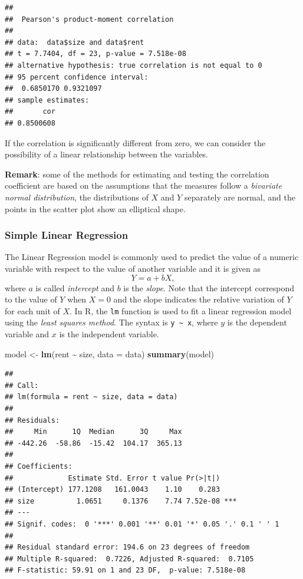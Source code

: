 \documentclass[
]{article}
\newenvironment{Shaded}{\begin{snugshade}}{\end{snugshade}}
\newcommand{\AttributeTok}[1]{\textcolor[rgb]{0.13,0.29,0.53}{#1}}
\newcommand{\FunctionTok}[1]{\textcolor[rgb]{0.13,0.29,0.53}{\textbf{#1}}}
\newcommand{\NormalTok}[1]{#1}
\newcommand{\OtherTok}[1]{\textcolor[rgb]{0.56,0.35,0.01}{#1}}
\newcommand{\SpecialCharTok}[1]{\textcolor[rgb]{0.81,0.36,0.00}{\textbf{#1}}}
\begin{document}
\begin{verbatim}
## 
##  Pearson's product-moment correlation
## 
## data:  data$size and data$rent
## t = 7.7404, df = 23, p-value = 7.518e-08
## alternative hypothesis: true correlation is not equal to 0
## 95 percent confidence interval:
##  0.6850170 0.9321097
## sample estimates:
##       cor 
## 0.8500608
\end{verbatim}

If the correlation is significantly different from zero, we can consider
the possibility of a linear relationship between the variables.

\textbf{Remark}: some of the methods for estimating and testing the
correlation coefficient are based on the assumptions that the measures
follow a \emph{bivariate normal distribution}, the distributions of
\(X\) and \(Y\) separately are normal, and the points in the scatter
plot show an elliptical shape.

\hypertarget{simple-linear-regression}{%
\subsubsection{Simple Linear
Regression}\label{simple-linear-regression}}

The Linear Regression model is commonly used to predict the value of a
numeric variable with respect to the value of another variable and it is
given as\\
\[ Y = a + b X,\] where \(a\) is called \emph{intercept} and \(b\) is
the \emph{slope}. Note that the intercept correspond to the value of
\(Y\) when \(X=0\) and the slope indicates the relative variation of
\(Y\) for each unit of \(X\). In R, the \texttt{lm} function is used to
fit a linear regression model using the \emph{least squares method}. The
syntax is \texttt{y\ \textasciitilde{}\ x}, where \(y\) is the dependent
variable and \(x\) is the independent variable.

\begin{Shaded}
\begin{Highlighting}[]
\NormalTok{model }\OtherTok{\textless{}{-}} \FunctionTok{lm}\NormalTok{(rent }\SpecialCharTok{\textasciitilde{}}\NormalTok{ size, }\AttributeTok{data =}\NormalTok{ data)}
\FunctionTok{summary}\NormalTok{(model)}
\end{Highlighting}
\end{Shaded}

\begin{verbatim}
## 
## Call:
## lm(formula = rent ~ size, data = data)
## 
## Residuals:
##     Min      1Q  Median      3Q     Max 
## -442.26  -58.86  -15.42  104.17  365.13 
## 
## Coefficients:
##             Estimate Std. Error t value Pr(>|t|)    
## (Intercept) 177.1208   161.0043    1.10    0.283    
## size          1.0651     0.1376    7.74 7.52e-08 ***
## ---
## Signif. codes:  0 '***' 0.001 '**' 0.01 '*' 0.05 '.' 0.1 ' ' 1
## 
## Residual standard error: 194.6 on 23 degrees of freedom
## Multiple R-squared:  0.7226, Adjusted R-squared:  0.7105 
## F-statistic: 59.91 on 1 and 23 DF,  p-value: 7.518e-08
\end{verbatim}
\end{document}
